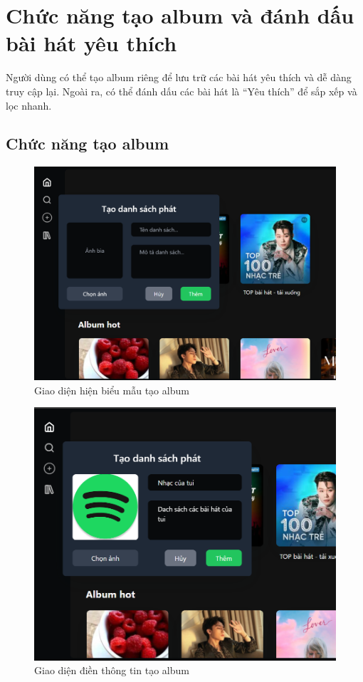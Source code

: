 \section{Chức năng tạo album và đánh dấu bài hát yêu thích}
Người dùng có thể tạo album riêng để lưu trữ các bài hát yêu thích và dễ dàng truy cập lại. Ngoài ra, có thể đánh dấu các bài hát là “Yêu thích” để sắp xếp và lọc nhanh.

\subsection{Chức năng tạo album}
\begin{figure}[H]
    \centering
    \includegraphics[width=1\textwidth]{imgs/chap5/tao_album_1.png}
    \caption{Giao diện hiện biểu mẫu tạo album}
\end{figure}

\begin{figure}[H]
    \centering
    \includegraphics[width=1\textwidth]{imgs/chap5/tao_album_2.png}
    \caption{Giao diện điền thông tin tạo album}
\end{figure}

